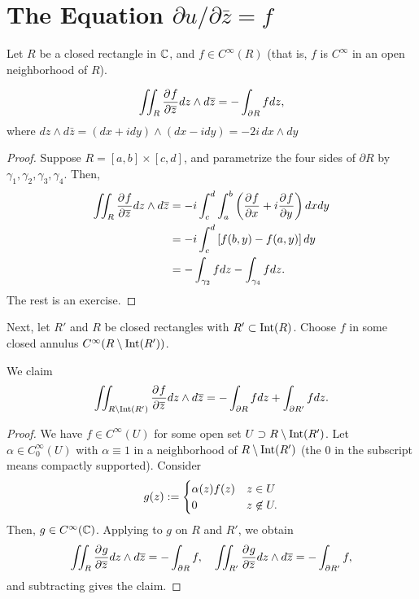 \documentclass[11pt]{article}
\begin{document}
\section{\texorpdfstring{The Equation $\partial u/\partial \bar z=f$}{The Equation du/dzbar = f}}

Let $R$ be a closed rectangle in $\mathbb{C}$, and $f \in C^{\infty}(R)$ (that is, $f$ is $C^\infty$ in an open neighborhood of $R$).

\begin{prop}[][label=prop:sortastokes]
    $$\iint_R\frac{\partial^{}f}{\partial \overline z^{}}dz\land d\overline z = -\int_{\partial R}f dz,$$
    where $dz \land d \bar z = (dx+idy)\land (dx - idy)=-2i\,dx \land dy$
\end{prop}

\begin{proof}
    Suppose $R=[a,b]\times [c,d]$, and parametrize the four sides of $\partial R$ by $\gamma_1,\gamma_2,\gamma_3,\gamma_4$. Then,
    \begin{align*}
        \iint_R \frac{\partial^{}f}{\partial \overline z^{}}dz \land d \overline z &=-i \int_{c}^d\int_a^b\left ( \frac{\partial^{}f}{\partial x^{}}+i\frac{\partial^{}f}{\partial y^{}} \right )dxdy
        \\ &= -i\int_c^d \left [ f(b,y)-f(a,y) \right ]dy
        \\ &=-\int_{\gamma_2}fdz -\int_{\gamma_4}fdz.
    \end{align*}
    The rest is an exercise.
\end{proof}

Next, let $R'$ and $R$ be closed rectangles with $R' \subset \operatorname{Int}(R)$. Choose $f$ in some closed annulus $C^\infty (R\setminus \operatorname{Int}(R'))$.
\begin{claim}
    We claim
    $$\iint_{R\setminus \operatorname{Int}(R')}\frac{\partial^{}f}{\partial \overline z^{}}dz \land d\overline z = -\int_{\partial R}fdz + \int_{\partial R'}fdz.$$
\end{claim}
\begin{proof}
    We have $f \in C^\infty (U)$ for some open set $U \supset R\setminus \operatorname{Int} (R')$. Let $\alpha \in C^\infty _0(U)$ with $\alpha \equiv 1$ in a neighborhood of $R\setminus \operatorname{Int}(R')$ (the $0$ in the subscript means compactly supported). Consider
    $$g(z) :=\begin{cases}\alpha(z)f(z) & z \in U \\ 0 & z \not \in U.\end{cases}$$
    Then, $g \in C^\infty (\mathbb{C})$. Applying  to $g$ on $R$ and $R'$, we obtain
    $$\iint_R \frac{\partial^{}g}{\partial \overline z^{}}dz \land d\overline z = -\int_{\partial R}f, \quad \iint_{R'}\frac{\partial^{}g}{\partial \overline z^{}}dz \land d\overline z=-\int_{\partial R'}f,$$
    and subtracting gives the claim.
\end{proof}
\end{document}
